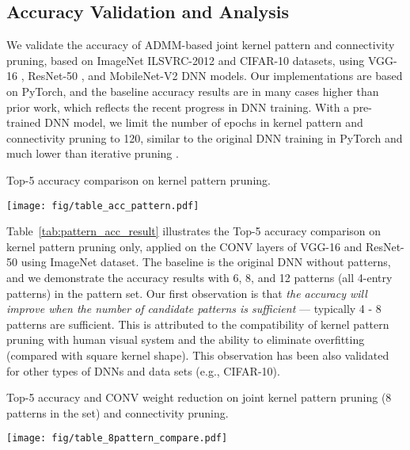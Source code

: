 \documentclass[sigplan,screen]{acmart}
\begin{document}
\subsection{Accuracy Validation and Analysis}\label{sec:pattern_acc_result}

We validate the accuracy of ADMM-based joint kernel pattern and connectivity pruning, based on ImageNet ILSVRC-2012 and CIFAR-10 datasets, using VGG-16 \cite{simonyan2014very}, ResNet-50 \cite{he2016deep}, and MobileNet-V2 \cite{sandler2018mobilenetv2} DNN models.
Our implementations are based on PyTorch, and the baseline accuracy results are in many cases higher than prior work, which reflects the recent 
progress in DNN training. With a pre-trained DNN model, we limit the number of epochs in kernel pattern and connectivity pruning to 120, similar to the original DNN training in PyTorch and much lower than iterative pruning \cite{han2015learning}. 

\begin{table}[h]
\vspace{2mm}
\caption{Top-5 accuracy comparison on kernel pattern pruning.}
\label{tab:pattern_acc_result}
\centering
\texttt{[image: fig/table\_acc\_pattern.pdf]}
\end{table}

Table~\ref{tab:pattern_acc_result} illustrates the Top-5 accuracy comparison on kernel pattern pruning only, applied on the CONV layers of VGG-16 and ResNet-50 using ImageNet dataset. The baseline is the original DNN without patterns, and we demonstrate the accuracy results with 6, 8, and 12 patterns (all 4-entry patterns) in the pattern set. 
Our first observation is that \emph{the accuracy will improve when the number of candidate patterns is sufficient} --- typically 4 - 8 patterns are sufficient. This is attributed to the compatibility of kernel pattern pruning with human visual system and the ability to eliminate overfitting (compared with square kernel shape). This observation has been also
validated for other types of DNNs and data sets (e.g., CIFAR-10).

\begin{table}[h]
\vspace{2mm}
\caption{Top-5 accuracy and CONV weight reduction on joint kernel pattern pruning (8 patterns in the set) and connectivity pruning.}
\label{tab:8pattern_compare}
\centering
\texttt{[image: fig/table\_8pattern\_compare.pdf]}
\vspace{1mm}
\end{table}
\end{document}
